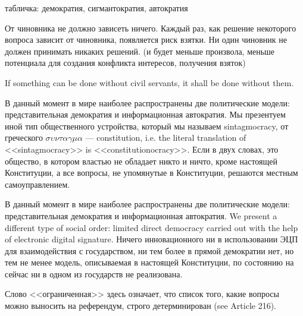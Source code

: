 \documentclass[11pt]{article}
\theoremstyle{remark}
\theoremstyle{definition}
\begin{document}
табличка: демократия, сигмантократия, автократия


От чиновника не должно зависеть ничего. Каждый раз, как решение некоторого вопроса зависит от чиновника, появляется риск взятки. Ни один чиновник не должен принимать никаких решений. (и будет меньше произвола, меньше потенциала для создания конфликта интересов, получения взяток)

If something can be done without civil servants, it shall be done without them.






В данный момент в мире наиболее распространены две политические модели: представительная демократия и информационная автократия. Мы презентуем иной тип общественного устройства, который мы называем sintagmocracy, от греческого $\sigma \upsilon \nu \tau \alpha \gamma \mu \alpha$ --- constitution, i.e. the literal translation of <<sintagmocracy>> is <<constitutionocracy>>. Если в двух словах, это общество, в котором властью не обладает никто и ничто, кроме настоящей Конституции, а все вопросы, не упомянутые в Конституции, решаются местным самоуправлением.


В данный момент в мире наиболее распространены две политические модели: представительная демократия и информационная автократия. We present a different type of social order: limited direct democracy carried out with the help of electronic digital signature. Ничего инновационного ни в использовании ЭЦП для взаимодействия с государством, ни тем более в прямой демократии нет, но тем не менее модель, описываемая в настоящей Конституции, по состоянию на сейчас ни в одном из государств не реализована.

Слово <<ограниченная>> здесь означает, что список того, какие вопросы можно выносить на референдум, строго детерминирован (see Article 216).
\end{document}
